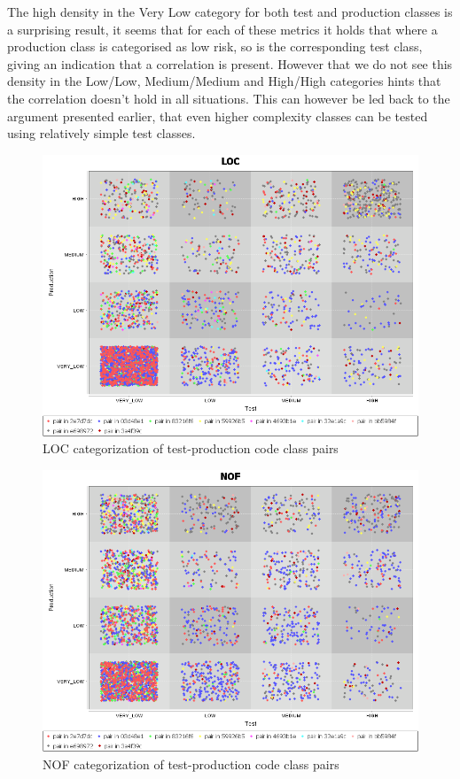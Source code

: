 The high density in the Very Low category for both test and production classes is a surprising result, it seems that for each of these metrics it holds that where a production class is categorised as low risk, so is the corresponding test class, giving an indication that a correlation is present. However that we do not see this density in the Low/Low, Medium/Medium and High/High categories hints that the correlation doesn't hold in all situations. This can however be led back to the argument presented earlier, that even higher complexity classes can be tested using relatively simple test classes.
\begin{figure}
    \centering
    \includegraphics[width=\linewidth]{resources/LOC.png}
    \caption{LOC categorization of test-production code class pairs}
    \label{figure:loc}
\end{figure}
\begin{figure}
    \centering
    \includegraphics[width=\linewidth]{resources/NOF.png}
    \caption{NOF categorization of test-production code class pairs}
    \label{figure:loc}
\end{figure}

